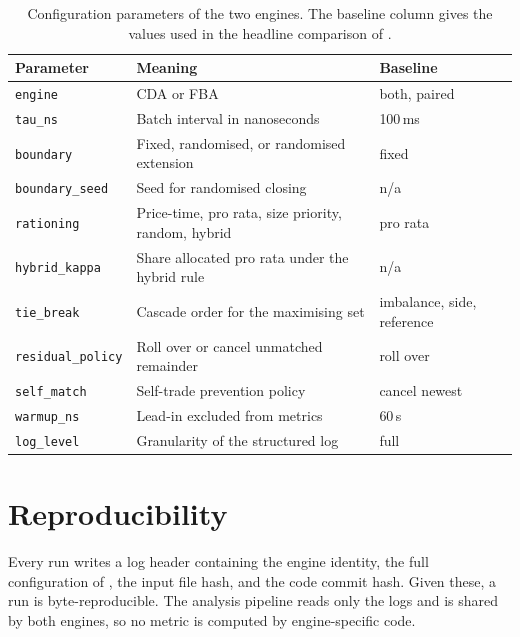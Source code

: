 \begin{table}[htbp]
\centering
\caption[Engine configuration parameters]{Configuration parameters of
the two engines. The baseline column gives the values used in the
headline comparison of .}
\label{tab:config}
\small
\begin{tabularx}{\textwidth}{@{}p{3.6cm} L p{2.8cm}@{}}
\toprule
\textbf{Parameter} & \textbf{Meaning} & \textbf{Baseline}\\
\midrule
\texttt{engine}            & CDA or FBA & both, paired\\
\texttt{tau\_ns}           & Batch interval in nanoseconds & 100\,ms\\
\texttt{boundary}          & Fixed, randomised, or randomised extension
& fixed\\
\texttt{boundary\_seed}    & Seed for randomised closing & n/a\\
\texttt{rationing}         & Price-time, pro rata, size priority,
random, hybrid & pro rata\\
\texttt{hybrid\_kappa}     & Share allocated pro rata under the hybrid
rule & n/a\\
\texttt{tie\_break}        & Cascade order for the maximising set &
imbalance, side, reference\\
\texttt{residual\_policy}  & Roll over or cancel unmatched remainder &
roll over\\
\texttt{self\_match}       & Self-trade prevention policy & cancel
newest\\
\texttt{warmup\_ns}        & Lead-in excluded from metrics & 60\,s\\
\texttt{log\_level}        & Granularity of the structured log & full\\
\bottomrule
\end{tabularx}
\end{table}

\chapter{Reproducibility}
\label{app:repro}

Every run writes a log header containing the engine identity, the full
configuration of , the input file hash, and the code
commit hash. Given these, a run is byte-reproducible. The analysis
pipeline reads only the logs and is shared by both engines, so no metric
is computed by engine-specific code.


